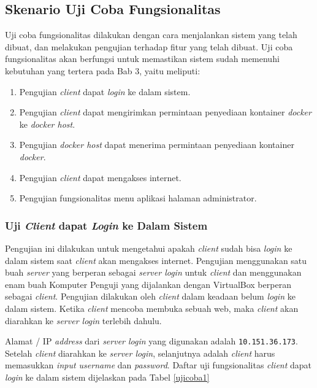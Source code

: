 \subsection{Skenario Uji Coba Fungsionalitas}
Uji coba fungsionalitas dilakukan dengan cara menjalankan sistem yang telah dibuat, dan melakukan pengujian terhadap fitur yang telah dibuat. Uji coba fungsionalitas akan berfungsi untuk memastikan sistem sudah memenuhi kebutuhan yang tertera pada Bab 3, yaitu meliputi:

\begin{enumerate}
\item Pengujian \textit{client} dapat \textit{login} ke dalam sistem.
\item Pengujian \textit{client} dapat mengirimkan permintaan penyediaan kontainer \textit{docker} ke \textit{docker host}.
\item Pengujian \textit{docker host} dapat menerima permintaan penyediaan kontainer \textit{docker}.
\item Pengujian \textit{client} dapat mengakses internet.
\item Pengujian fungsionalitas menu aplikasi halaman administrator.
\end{enumerate}

\subsubsection{Uji \textit{Client} dapat \textit{Login} ke Dalam Sistem}
Pengujian ini dilakukan untuk mengetahui apakah \textit{client} sudah bisa \textit{login} ke dalam sistem saat \textit{client} akan mengakses internet. Pengujian menggunakan satu buah \textit{server} yang berperan sebagai \textit{server login} untuk \textit{client} dan menggunakan enam buah Komputer Penguji yang dijalankan dengan VirtualBox berperan sebagai \textit{client}. Pengujian dilakukan oleh \textit{client} dalam keadaan belum \textit{login} ke dalam sistem. Ketika \textit{client} mencoba membuka sebuah web, maka \textit{client} akan diarahkan ke \textit{server login} terlebih dahulu.

Alamat / IP \textit{address} dari \textit{server login} yang digunakan adalah \texttt{10.151.36.173}. Setelah \textit{client} diarahkan ke \textit{server login}, selanjutnya adalah \textit{client} harus memasukkan \textit{input username} dan \textit{password}. Daftar uji fungsionalitas \textit{client} dapat \textit{login} ke dalam sistem dijelaskan pada Tabel \ref{ujicoba1}

